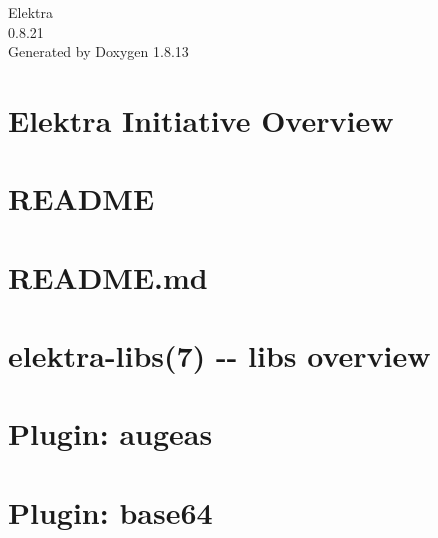 \documentclass[twoside]{book}
\newcommand{\+}{\discretionary{\mbox{\scriptsize$\hookleftarrow$}}{}{}}
\newcommand{\clearemptydoublepage}{%
  \newpage{\pagestyle{empty}\cleardoublepage}%
}
\begin{document}
\hypersetup{pageanchor=false,
             bookmarksnumbered=true,
             pdfencoding=unicode
            }
\begin{titlepage}
\vspace*{7cm}
\begin{center}%
{\Large Elektra \\[1ex]\large 0.\+8.\+21 }\\
\vspace*{1cm}
{\large Generated by Doxygen 1.8.13}\\
\end{center}
\end{titlepage}
\clearemptydoublepage
{}
\tableofcontents
\clearemptydoublepage
{}
\hypersetup{pageanchor=true}

\chapter{Elektra Initiative Overview}
\label{index}\hypertarget{index}{}
\chapter{R\+E\+A\+D\+ME}
\label{md_src_libs_elektra_README}

\chapter{R\+E\+A\+D\+M\+E.\+md}
\label{src_libs_getenv_README_md}

\chapter{elektra-\/libs(7) -\/-\/ libs overview}
\label{md_src_libs_README}

\chapter{Plugin\+: augeas}
\label{md_src_plugins_augeas_README}

\chapter{Plugin\+: base64}
\label{md_src_plugins_base64_README}

\end{document}
